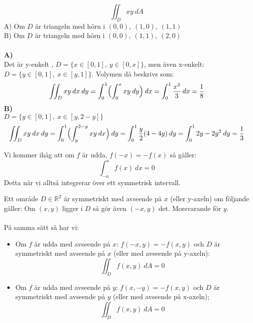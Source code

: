 \documentclass{report}
\begin{document}
\pagebreak
{}
{
\begin{equation*}
\iint_{D}^{} xy \: dA 
\end{equation*}
A) Om $ D $ är triangeln med hörn i $ (0,0), \: (1,0), \: (1,1) $\\
B) Om $ D $ är triangeln med hörn i $ (0,0), \: (1,1), \: (2,0) $\\\\

\textbf{A)}\\
Det är y-enkelt , $ D = \{ x \in [0,1], \: y \in [0,x] \} $, men även x-enkelt: $ D = \{y \in [0,1], \: x \in [y,1]  \} $. Volymen då beskrivs som:
\begin{equation*}
\iint_{D}^{} xy \: dx   \: dy = \int_{0}^{1} \Bigl( \int_{0}^{x} xy \: dy   \Bigr) \: dx = \int_{0}^{1} \frac{x^3}{3}  \: dx = \frac{1}{8}    
\end{equation*}
\textbf{B)}\\
$ D = \{ y \in [0,1], \: x \in [y,2-y] \} $ 
\begin{equation*}
\iint_{D}^{} xy \: dx   \: dy = \int_{0}^{1} \Bigl( \int_{y}^{2-y} xy \: dx  \Bigr)  \: dy = \int_{0}^{1} \frac{y}{2} (4-4y) \: dy = \int_{0}^{1} 2y-2y^2 \: dy = \frac{1}{3}     
\end{equation*}
}

\vspace{20pt}
\noindent
Vi kommer ihåg att om $ f $ är udda, $ f(-x) = -f(x) $ så gäller:
\begin{equation*}
\int_{-a}^{a} f(x) \: dx = 0 
\end{equation*}
Detta när vi alltså integrerar över ett symmetrisk intervall.

\vspace{20pt}
{
Ett område $ D \in \mathbb{R}^2 $ är symmetriskt med avseende på $ x $ (eller y-axeln) om följande gäller: Om $ (x,y) $ ligger i $ D $ så gör även $ (-x,y) $ det. Morsvarande för $ y $.\\\\

På samma sätt så har vi:
\begin{itemize}
	\item Om $ f $ är udda med avseende på $ x $: $ f(-x,y) = -f(x,y) $ och $ D $ är symmetriskt med avseende på $ x $ (eller med avseende på y-axeln):
		\begin{equation*}
		\iint_{D}^{} f(x,y) \: dA = 0 
		\end{equation*}
	\item Om $ f $ är udda med avseende på $ y $: $ f(x,-y) = -f(x,y) $ och $ D $ är symmetriskt med avseende på $ y $ (eller med avseende på x-axeln);
	\begin{equation*}
	\iint_{D}^{} f(x,y) \: dA = 0 
	\end{equation*}
	
		
\end{itemize}
}
\end{document}
